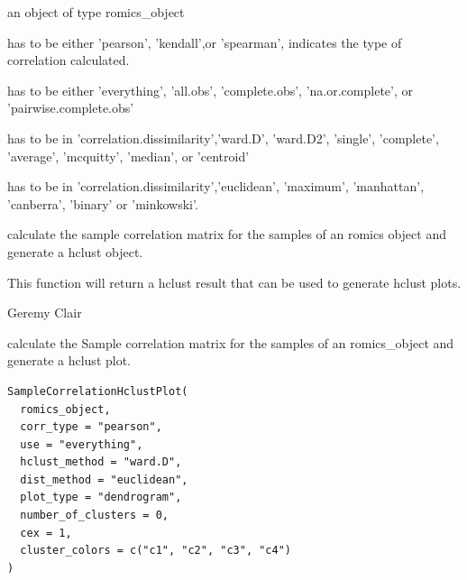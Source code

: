 \documentclass[a4paper]{book}
\begin{document}
%
\begin{Arguments}
\begin{ldescription}
\item[\code{romics\_object}] an object of type romics\_object

\item[\code{corr\_type}] has to be either 'pearson', 'kendall',or 'spearman', indicates the type of correlation calculated.

\item[\code{use}] has to be either 'everything', 'all.obs', 'complete.obs', 'na.or.complete', or 'pairwise.complete.obs'

\item[\code{hclust\_method}] has to be in 'correlation.dissimilarity','ward.D', 'ward.D2', 'single', 'complete', 'average', 'mcquitty', 'median', or 'centroid'

\item[\code{dist\_method}] has to be in 'correlation.dissimilarity','euclidean', 'maximum', 'manhattan', 'canberra', 'binary' or 'minkowski'.
\end{ldescription}
\end{Arguments}
%
\begin{Details}
calculate the sample correlation matrix for the samples of an romics object and generate a hclust object.
\end{Details}
%
\begin{Value}
This function will return a hclust result that can be used to generate hclust plots.
\end{Value}
%
\begin{Author}
Geremy Clair
\end{Author}
%
\begin{Description}
calculate the Sample correlation matrix for the samples of an romics\_object and generate a hclust plot.
\end{Description}
%
\begin{Usage}
\begin{verbatim}
SampleCorrelationHclustPlot(
  romics_object,
  corr_type = "pearson",
  use = "everything",
  hclust_method = "ward.D",
  dist_method = "euclidean",
  plot_type = "dendrogram",
  number_of_clusters = 0,
  cex = 1,
  cluster_colors = c("c1", "c2", "c3", "c4")
)
\end{verbatim}
\end{Usage}
%
\end{document}
